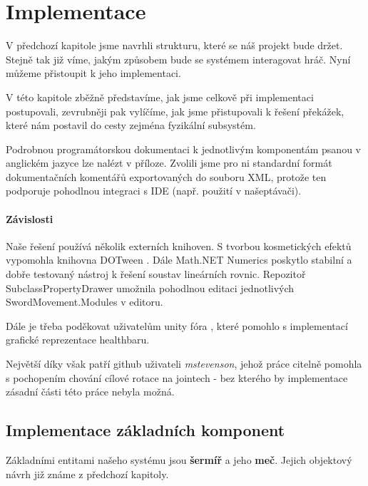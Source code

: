\chapter{Implementace}

V předchozí kapitole jsme navrhli strukturu, které se náš projekt bude držet. Stejně tak již víme, jakým způsobem bude se systémem interagovat hráč. Nyní můžeme přistoupit k jeho implementaci.

V této kapitole zběžně představíme, jak jsme celkově při implementaci postupovali, zevrubněji pak vylíčíme, jak jsme přistupovali k řešení překážek, které nám postavil do cesty zejména fyzikální subsystém. 

Podrobnou programátorskou dokumentaci k jednotlivým komponentám psanou v anglickém jazyce lze nalézt v příloze. Zvolili jsme pro ni standardní formát dokumentačních komentářů exportovaných do souboru XML, protože ten podporuje pohodlnou integraci s IDE (např. použití v našeptávači).

\subsubsection*{Závislosti}
Naše řešení používá několik externích knihoven. S tvorbou kosmetických efektů vypomohla knihovna DOTween \cite{DoTween}. Dále Math.NET Numerics \cite{MathDotNetNumerics} poskytlo stabilní a dobře testovaný nástroj k řešení soustav lineárních rovnic. Repozitoř SubclassPropertyDrawer \cite{SubclassPropertyDrawer} umožnila pohodlnou editaci jednotlivých SwordMovement.Modules v editoru. 

Dále je třeba poděkovat uživatelům unity fóra \cite{InvertReverseUIMask}, které pomohlo s implementací grafické reprezentace healthbaru.

Největší díky však patří github uživateli \textit{mstevenson}, jehož práce \cite{ConfigurableJointExtensions} citelně pomohla s pochopením chování cílové rotace na jointech - bez kterého by implementace zásadní části této práce nebyla možná.

\section{Implementace základních komponent}

Základními entitami našeho systému jsou \textbf{šermíř} a jeho \textbf{meč}. Jejich objektový návrh již známe z předchozí kapitoly.


